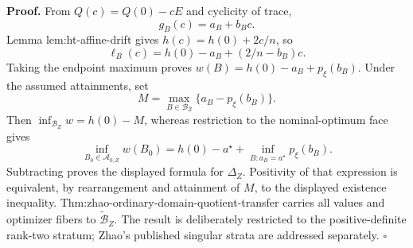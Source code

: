 \textbf{Proof.}
From \(Q(c)=Q(0)-cE\) and cyclicity of trace,
\[
g_B(c)=a_B+b_Bc.
\tag{1}
\]
Lemma lem:ht-affine-drift gives \(h(c)=h(0)+2c/n\), so
\[
\ell_B(c)=h(0)-a_B+(2/n-b_B)c.
\]
Taking the endpoint maximum proves \(w(B)=h(0)-a_B+p_\xi(b_B)\).  Under the assumed attainments, set
\[
M=\max_{B\in\mathcal B_Z}\{a_B-p_\xi(b_B)\}.
\]
Then \(\inf_{\mathcal B_Z}w=h(0)-M\), whereas restriction to the nominal-optimum face gives
\[
\inf_{B_0\in\mathcal A_{0,Z}}w(B_0)
=h(0)-a^\star+\inf_{B:a_B=a^\star}p_\xi(b_B).
\]
Subtracting proves the displayed formula for \(\Delta_Z\).  Positivity of that expression is equivalent, by rearrangement and attainment of \(M\), to the displayed existence inequality.  Thm:zhao-ordinary-domain-quotient-transfer carries all values and optimizer fibers to \(\widetilde{\mathcal B}_Z\).  The result is deliberately restricted to the positive-definite rank-two stratum; Zhao's published singular strata are addressed separately. \(\square\)